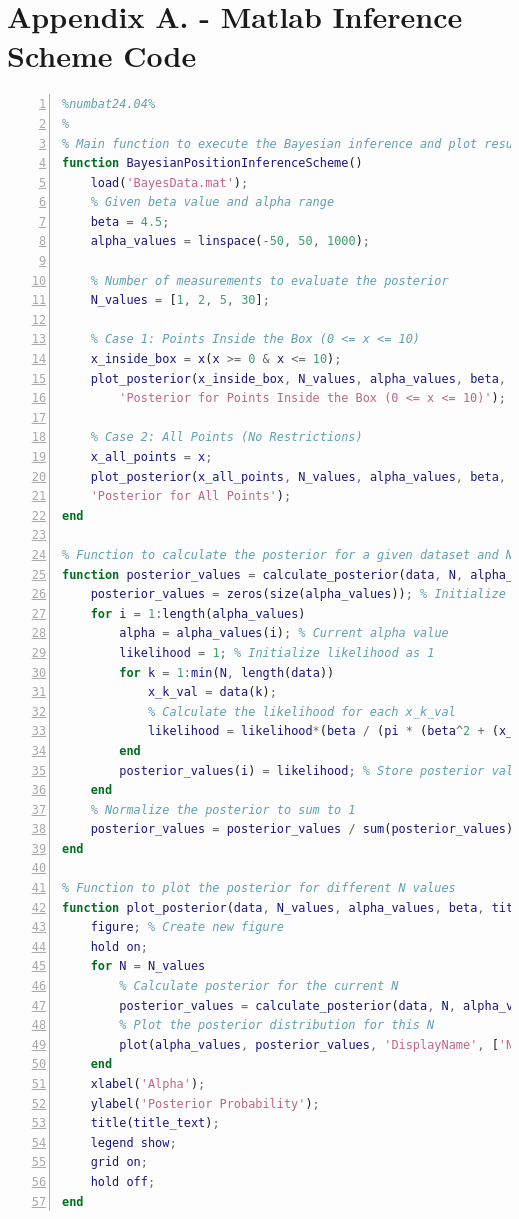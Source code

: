 \documentclass[a4paper,11pt]{article}
\begin{document}
\section{Appendix A. - Matlab Inference Scheme Code}
\begin{lstlisting}[language=Matlab,
                   numbers=left,
                   basicstyle=\footnotesize,
                   stepnumber=1,
                   numbersep=10pt,
                   tabsize=2,
                   showspaces=false,
                   showstringspaces=false]
%%%%%%%%%Bayesian Position Inference Scheme%%%%%%%%%%%%
%numbat24.04%
%
% Main function to execute the Bayesian inference and plot results
function BayesianPositionInferenceScheme()
    load('BayesData.mat');
    % Given beta value and alpha range
    beta = 4.5;
    alpha_values = linspace(-50, 50, 1000);

    % Number of measurements to evaluate the posterior
    N_values = [1, 2, 5, 30];

    % Case 1: Points Inside the Box (0 <= x <= 10)
    x_inside_box = x(x >= 0 & x <= 10);
    plot_posterior(x_inside_box, N_values, alpha_values, beta, ...
        'Posterior for Points Inside the Box (0 <= x <= 10)');

    % Case 2: All Points (No Restrictions)
    x_all_points = x; 
    plot_posterior(x_all_points, N_values, alpha_values, beta, 
    'Posterior for All Points');
end

% Function to calculate the posterior for a given dataset and N points
function posterior_values = calculate_posterior(data, N, alpha_values, beta)
    posterior_values = zeros(size(alpha_values)); % Initialize posterior array
    for i = 1:length(alpha_values)
        alpha = alpha_values(i); % Current alpha value
        likelihood = 1; % Initialize likelihood as 1
        for k = 1:min(N, length(data))
            x_k_val = data(k);
            % Calculate the likelihood for each x_k_val
            likelihood = likelihood*(beta / (pi * (beta^2 + (x_k_val - alpha)^2)));
        end
        posterior_values(i) = likelihood; % Store posterior value
    end
    % Normalize the posterior to sum to 1
    posterior_values = posterior_values / sum(posterior_values);
end

% Function to plot the posterior for different N values
function plot_posterior(data, N_values, alpha_values, beta, title_text)
    figure; % Create new figure
    hold on;
    for N = N_values
        % Calculate posterior for the current N
        posterior_values = calculate_posterior(data, N, alpha_values, beta);
        % Plot the posterior distribution for this N
        plot(alpha_values, posterior_values, 'DisplayName', ['N = ', num2str(N)]);
    end
    xlabel('Alpha');
    ylabel('Posterior Probability');
    title(title_text);
    legend show;
    grid on;
    hold off;
end
\end{lstlisting}
\end{document}
